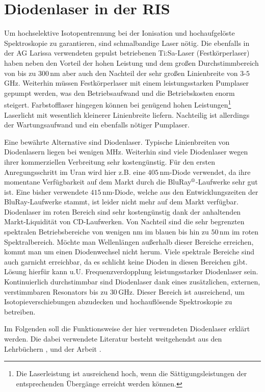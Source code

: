 \section{Diodenlaser in der RIS}\label{sec:diodenlaser}
Um hochselektive Isotopentrennung bei der Ionisation und hochaufgelöste
Spektroskopie zu garantieren, sind schmalbandige Laser nötig. Die ebenfalls in
der AG Larissa verwendeten gepulst betriebenen Ti:Sa-Laser (Festkörperlaser)
haben neben den Vorteil der hohen Leistung und dem großen Durchstimmbereich von
bis zu $300\,$nm aber auch den Nachteil der sehr großen Linienbreite von
$3$-$5\,$GHz.
Weiterhin müssen Festkörperlaser mit einem leistungsstarken Pumplaser gepumpt
werden, was den Betriebsaufwand und die Betriebskosten enorm steigert.
Farbstofflaser hingegen können bei genügend hohen
Leistungen\footnote{Die Laserleistung ist ausreichend hoch, wenn die
Sättigungsleistungen der entsprechenden Übergänge erreicht werden können.}
Laserlicht mit wesentlich kleinerer Linienbreite liefern. Nachteilig ist
allerdings der Wartungsaufwand und ein ebenfalls nötiger Pumplaser.\par
Eine bewährte Alternative sind Diodenlaser. Typische Linienbreiten von Diodenlasern liegen bei wenigen
MHz. Weiterhin sind viele Diodenlaser wegen ihrer
kommerziellen Verbreitung sehr kostengünstig. Für den ersten Anregungsschritt im
Uran wird hier z.B. eine $405\,$nm-Diode verwendet, da ihre momentane
Verfügbarkeit auf dem Markt durch die BluRay$^\text{\textregistered}$-Laufwerke sehr
gut ist.
Eine bisher verwendete $415\,$nm-Diode, welche aus den Entwicklungszeiten der
BluRay-Laufwerke stammt, ist leider nicht mehr auf dem Markt verfügbar. Diodenlaser im roten Bereich sind
sehr kostengünstig dank der anhaltenden Markt-Liquidität von CD-Laufwerken. Von
Nachteil sind die sehr begrenzten spektralen Betriebsbereiche von wenigen nm im blauen bis hin zu $50\,$nm im roten Spektralbereich. Möchte man Wellenlängen außerhalb dieser Bereiche erreichen, kommt man um einen
Diodenwechsel nicht herum. Viele spektrale Bereiche sind auch garnicht
erreichbar, da es schlicht keine Dioden in diesen Bereichen gibt. Lösung
hierfür kann u.U. Frequenzverdopplung leistungsstarker Diodenlaser sein.
Kontinuierlich durchstimmbar sind Diodenlaser dank eines zusätzlichen, externen,
verstimmbaren Resonators bis zu $30\,$GHz. Dieser Bereich ist ausreichend, um Isotopieverschiebungen abzudecken und hochauflösende Spektroskopie zu betreiben.\par Im Folgenden soll die Funktionsweise der hier
verwendeten Diodenlaser erklärt werden. Die dabei verwendete Literatur besteht
weitgehendst aus den Lehrbüchern \cite{demtroeder:ex3}, \cite{chow:semiconductor-laser} und der
Arbeit \cite{schumann:2001:diplomarbeit}.

